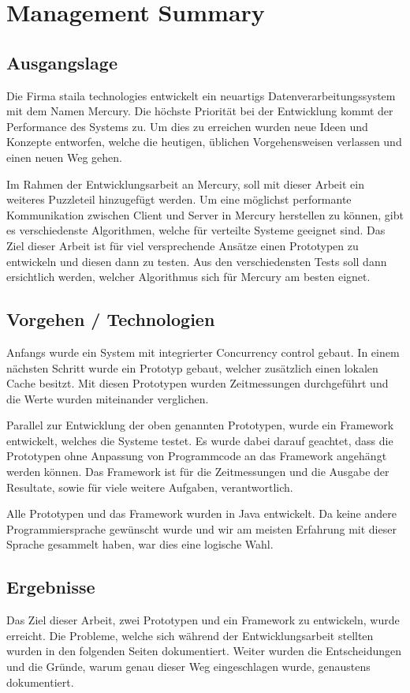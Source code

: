 \chapter*{Management Summary}

\section*{Ausgangslage}
Die Firma staila technologies ent\-wick\-elt ein neuartigs Daten\-ver\-arbeitungs\-system mit dem Namen Mercury. Die höchste Priorität bei der Entwicklung kommt der Performance des Systems zu. Um dies zu erreichen wurden neue Ideen und Konzepte entworfen, welche die heutigen, üblichen Vorgehensweisen verlassen und einen neuen Weg gehen.

Im Rahmen der Entwicklungsarbeit an Mercury, soll mit dieser Arbeit ein weiteres Puzzleteil hinzugefügt werden. Um eine möglichst performante Kommunikation zwischen Client und Server in Mercury herstellen zu können, gibt es verschiedenste Algorithmen, welche für verteilte Systeme geeignet sind. Das Ziel dieser Arbeit ist für viel versprechende Ansätze einen Prototypen zu entwickeln und diesen dann zu testen. Aus den verschiedensten Tests soll dann ersichtlich werden, welcher Algorithmus sich für Mercury am besten eignet.

\section*{Vorgehen / Technologien}
Anfangs wurde ein System mit integrierter Concurrency control gebaut. In einem nächsten Schritt wurde ein Prototyp gebaut, welcher zusätzlich einen lokalen Cache besitzt. Mit diesen Prototypen wurden Zeitmessungen durchgeführt und die Werte wurden miteinander verglichen.

Parallel zur Ent\-wick\-lung der oben ge\-nannten Pro\-to\-typ\-en, wur\-de ein Frame\-work entwickelt, welches die Systeme testet. Es wurde dabei darauf geachtet, dass die Prototypen ohne Anpassung von Programmcode an das Framework angehängt werden können. Das Framework ist für die Zeitmessungen und die Ausgabe der Resultate, sowie für viele weitere Aufgaben, verantwortlich.

Alle Prototypen und das Framework wurden in Java entwickelt. Da keine andere Programmiersprache gewünscht wurde und wir am meisten Erfahrung mit dieser Sprache gesammelt haben, war dies eine logische Wahl.
\section*{Ergebnisse}
Das Ziel dieser Arbeit, zwei Prototypen und ein Framework zu entwickeln, wurde erreicht. Die Probleme, welche sich während der Entwicklungsarbeit stellten wurden in den folgenden Seiten dokumentiert. Weiter wurden die Entscheidungen und die Gründe, warum genau dieser Weg eingeschlagen wurde, genaustens dokumentiert.

